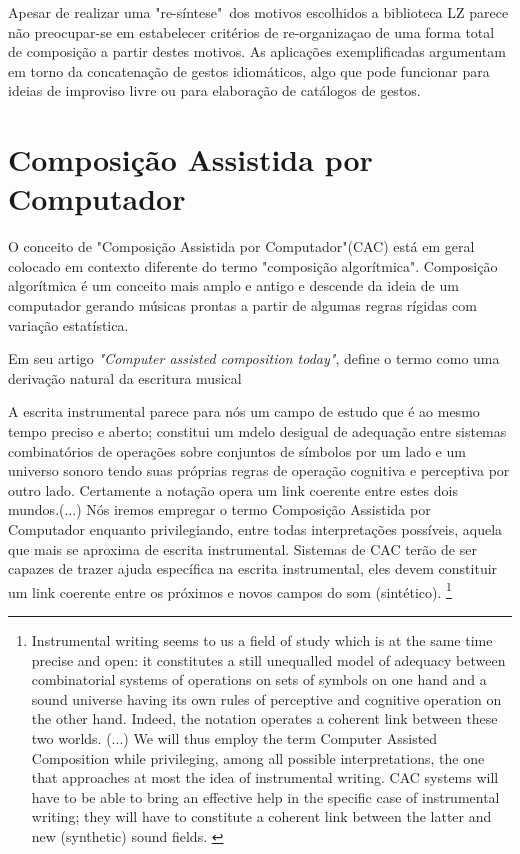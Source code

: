 \documentclass[
	12pt,				%
	openright,			%
	twoside,			%
	a4paper,			%
	english,			%
	french,				%
	spanish,			%
	brazil				%
	]{abntex2}
\begin{document}
Apesar de realizar uma "re-síntese"\ dos motivos escolhidos a biblioteca LZ parece não preocupar-se em estabelecer critérios de re-organizaçao de uma forma total de composição a partir destes motivos. As aplicações exemplificadas argumentam em torno da concatenação de gestos idiomáticos, algo que pode funcionar para ideias de improviso livre ou para elaboração de catálogos de gestos. 





\chapter{Composição Assistida por Computador}
\label{cac}

O conceito de "Composição Assistida por Computador"(CAC) está em geral colocado em contexto diferente do termo "composição algorítmica". Composição algorítmica é um conceito mais amplo e antigo e descende da ideia de um computador gerando músicas prontas a partir de algumas regras rígidas com variação estatística.

Em seu artigo \textit{"Computer assisted composition today"},  define o termo como uma derivação natural da escritura musical

\begin{citacao}
A escrita instrumental parece para nós um campo de estudo que é ao mesmo tempo preciso e aberto; constitui um mdelo desigual de adequação entre sistemas combinatórios de operações sobre conjuntos de símbolos por um lado e um universo sonoro tendo suas próprias regras  de operação cognitiva e perceptiva por outro lado. Certamente a notação opera um link coerente entre estes dois mundos.(...)
Nós iremos empregar o termo Composição Assistida por Computador enquanto privilegiando, entre todas interpretações possíveis, aquela que mais se aproxima de escrita instrumental. Sistemas de CAC terão de ser capazes de trazer ajuda específica na escrita instrumental, eles devem constituir um link coerente entre os próximos e novos campos do som (sintético). \cite[ p.07]{assayag1999computer} \footnote{
Instrumental writing seems to us a field of study which is at the same time precise and open: it constitutes a still unequalled model of adequacy between combinatorial systems of operations on sets of symbols on one hand and a sound universe having its own rules of perceptive and cognitive operation on the other hand. Indeed, the notation operates a coherent link between these two worlds. (...) We will thus employ the term Computer Assisted Composition while privileging, among all possible interpretations, the one that approaches at most the idea of instrumental writing. CAC systems will have to be able to bring an effective help in the specific case of instrumental writing; they will have to constitute a coherent link between the latter and new (synthetic) sound fields. \cite[ p.07]{assayag1999computer}}
\end{citacao}
\end{document}
